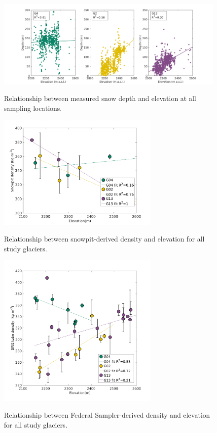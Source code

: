 \documentclass[12pt]{article}
\begin{document}
{
\begin{figure} 
	\includegraphics[width =1.1\linewidth]{DepthElevation.png}\\
	\caption{Relationship between measured snow depth and elevation at all sampling locations.}
	\label{fig:depth_elev}
\end{figure}
}
{
\begin{figure} 
	\centering
	\includegraphics[width = 0.7\textwidth]{ElevationVsSnowpit_all.png}\\
	\caption{Relationship between snowpit-derived density and elevation for all study glaciers.}
	\label{fig:elev_snowpit}
\end{figure}
}
{
\begin{figure} 
	\centering
	\includegraphics[width = 0.7\textwidth]{ElevationVsSWEtube_all.png}\\
	\caption{Relationship between Federal Sampler-derived density and elevation for all study glaciers.}
	\label{fig:elev_tube}
\end{figure}
}
\end{document}
